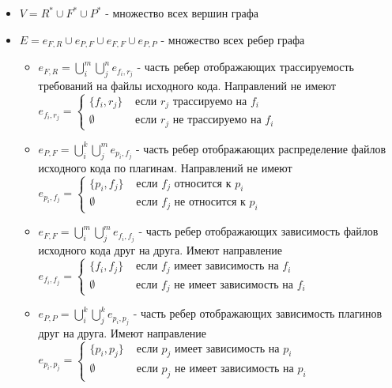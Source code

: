 \documentclass{article}
\begin{document}
  \begin{itemize}
    \item $V = R^* \cup F^* \cup P^*$ - множество всех вершин графа
    \item $E = e_{F, R} \cup e_{P, F} \cup e_{F, F} \cup e_{P, P}$ - множество всех ребер графа
    \begin{itemize}
      \item $e_{F, R} = \bigcup^m_i \bigcup^n_j e_{f_i, r_j}$ - часть ребер отображающих трассируемость требований на файлы исходного кода. Направлений не имеют \\
      $
        e_{f_i, r_j} =
        \begin{cases}
          \{f_i, r_j\} & \text{ если } r_j \text{ трассируемо на } f_i \\
          \emptyset & \text{ если } r_j \text{ не трассируемо на } f_i
        \end{cases}
      $
      \item $e_{P, F} = \bigcup^k_i \bigcup^m_j e_{p_i, f_j}$ - часть ребер отображающих распределение файлов исходного кода по плагинам. Направлений не имеют \\
      $
        e_{p_i, f_j} =
        \begin{cases}
          \{p_i, f_j\} & \text{ если } f_j \text{ относится к } p_i \\
          \emptyset & \text{ если } f_j \text{ не относится к } p_i
        \end{cases}
      $
      \item $e_{F, F} = \bigcup^m_i \bigcup^m_j e_{f_i, f_j}$ - часть ребер отображающих зависимость файлов исходного кода друг на друга. Имеют направление \\
      $
        e_{f_i, f_j} =
        \begin{cases}
          \{f_i, f_j\} & \text{ если } f_j \text{ имеет зависимость на } f_i \\
          \emptyset & \text{ если } f_j \text{ не имеет зависимость на } f_i
        \end{cases}
      $
      \item $e_{P, P} = \bigcup^k_i \bigcup^k_j e_{p_i, p_j}$ - часть ребер отображающих зависимость плагинов друг на друга. Имеют направление \\
      $
        e_{p_i, p_j} =
        \begin{cases}
          \{p_i, p_j\} & \text{ если } p_j \text{ имеет зависимость на } p_i \\
          \emptyset & \text{ если } p_j \text{ не имеет зависимость на } p_i
        \end{cases}
      $
    \end{itemize}
  \end{itemize}
\end{document}
